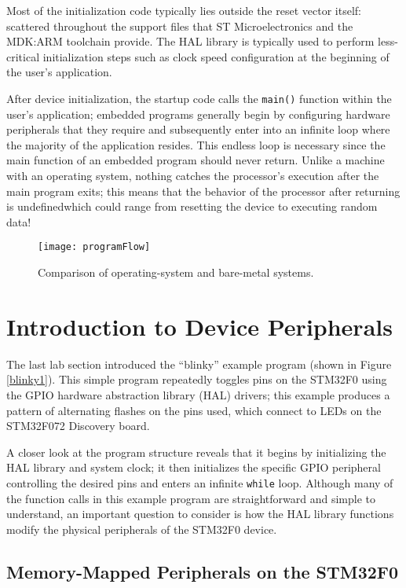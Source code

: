 \documentclass[openany,11pt,fleqn]{book} %
\begin{document}
Most of the initialization code typically lies outside the reset vector itself: scattered throughout the support files that ST Microelectronics and the MDK:ARM toolchain provide. The HAL library is typically used to perform less-critical initialization steps such as clock speed configuration at the beginning of the user's application. 

After device initialization, the startup code calls the \texttt{main()} function within the user's application; embedded programs generally begin by configuring hardware peripherals that they require and subsequently enter into an infinite loop where the majority of the application resides. This endless loop is necessary since the main function of an embedded program should never return. Unlike a machine with an operating system, nothing catches the processor's execution after the main program exits; this means that the behavior of the processor after returning is undefined\textemdash which could range from resetting the device to executing random data!

\begin{figure}[]
    \centering\texttt{[image: programFlow]}
    \caption{Comparison of operating-system and bare-metal systems. }
    \label{programFlow}
\end{figure}


\section{\color{orange}Introduction to Device Peripherals}

The last lab section introduced the ``blinky'' example program (shown in Figure \ref{blinky1}). This simple program repeatedly toggles pins on the STM32F0 using the GPIO hardware abstraction library (HAL) drivers; this example produces a pattern of alternating flashes on the pins used, which connect to LEDs on the STM32F072 Discovery board. 

A closer look at the program structure reveals that it begins by initializing the HAL library and system clock; it then initializes the specific GPIO peripheral controlling the desired pins and enters an infinite \texttt{while} loop. Although many of the function calls in this example program are straightforward and simple to understand, an important question to consider is how the HAL library functions modify the physical peripherals of the STM32F0 device.

\subsection{\color{orange}Memory-Mapped Peripherals on the STM32F0}
\end{document}
